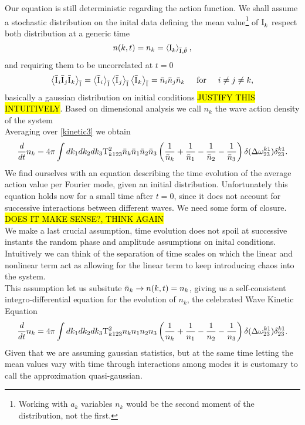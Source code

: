 Our equation is still deterministic regarding the action function. We shall assume a stochastic distribution on the inital data defining 
the mean value\footnote{Working with $a_k$ variables $n_k$ would be the second moment of the distribution, not the first.}
of $\mathrm{I}^{}_k$ respect both distribution at a generic time
\begin{equation}
    n(k,t) = n_k = \left\langle \mathrm{I}^{}_k \right\rangle_{\bar{\mathrm{I}^{}}, \bar{\theta}^{}},
\end{equation}     
and requiring them to be uncorrelated at $t=0$ \\
\begin{equation}
    \left\langle \bar{\mathrm{I}^{}}_i \bar{\mathrm{I}^{}}_j \bar{\mathrm{I}^{}}_k\right\rangle_{\bar{\mathrm{I}^{}}} = 
    \left\langle\bar{\mathrm{I}^{}}_i \right\rangle_{\bar{\mathrm{I}^{}}} \left\langle \bar{\mathrm{I}^{}}_j \right\rangle_{\bar{\mathrm{I}^{}}} \left\langle \bar{\mathrm{I}^{}}_k \right\rangle_{\bar{\mathrm{I}^{}}}
    = \bar{n}_i \bar{n}_j \bar{n}_k \hspace{5mm} \text{for} \hspace{5mm} i\neq j\neq k, 
\end{equation}
basically a gaussian distribution on initial conditions \hl{JUSTIFY THIS INTUITIVELY}. Based on dimensional analysis we call 
$n_k$ the wave action density of the system\\
Averaging over \eqref{kinetic3} we obtain
\begin{equation}
    \frac{d}{dt} n_k = 4 \pi\int dk_1 dk_2 dk_3 \\
    \mathrm{T}^2_{k123}\bar{n}_k\bar{n}_1\bar{n}_2\bar{n}_3
    \left(\frac{1}{\bar{n}_k} + \frac{1}{\bar{n}_1} - \frac{1}{\bar{n}_2}- \frac{1}{\bar{n}_3}  \right)
    \delta(\Delta{\omega}^{k1}_{23})\delta^{k1}_{23}.
    \label{kinetic4}
\end{equation}
We find ourselves with an equation describing the time evolution of the average action value per Fourier mode, given an initial distribution.
Unfortunately this equation holds now for a small time after $t=0$, 
since it does not account for successive interactions between different waves. We need some form of closure. \hl{DOES IT MAKE SENSE?, THINK AGAIN}\\ 
We make a last crucial assumption, time evolution does not spoil at successive instants the random phase and amplitude 
assumptions on inital conditions. Intuitively we can think of the separation of time scales on which the linear and nonlinear term act as allowing for 
the linear term to keep introducing chaos into the system. \\
This assumption let us subsitute $\bar{n}_k \rightarrow n(k,t) = n_k$, giving us a self-consistent integro-differential equation for the evolution of $n_k$, the celebrated
Wave Kinetic Equation 
\begin{equation}
    \frac{d}{dt} n_k = 4 \pi\int dk_1 dk_2 dk_3 \\
    \mathrm{T}^2_{k123}n_kn_1n_2n_3
    \left(\frac{1}{n_k} + \frac{1}{n_1} - \frac{1}{n_2}- \frac{1}{n_3}  \right)
    \delta(\Delta{\omega}^{k1}_{23})\delta^{k1}_{23}.
    \label{kinetic}
\end{equation}
Given that we are assuming gaussian statistics, but at the same time letting the mean values vary with time through interactions among modes
it is customary to call the approximation quasi-gaussian. \\ 

